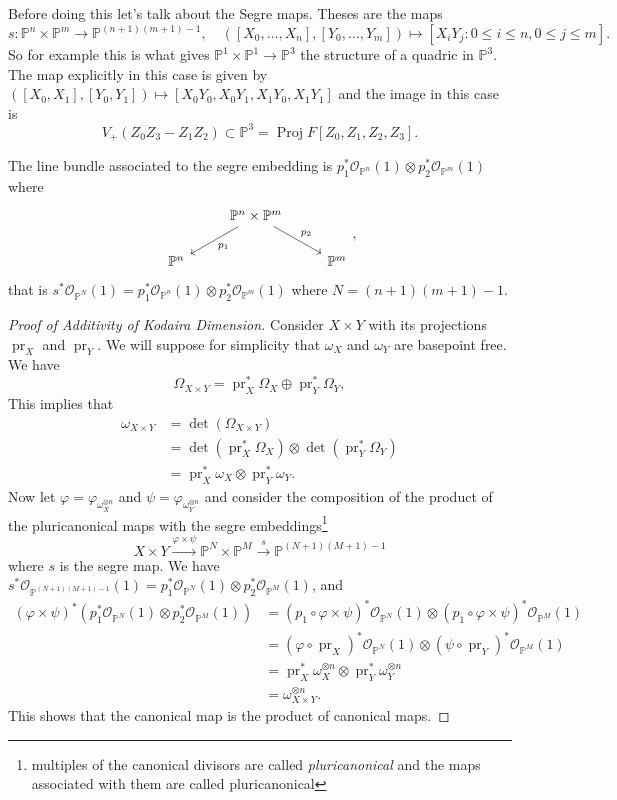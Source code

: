 \documentclass[12pt]{article}
\numberwithin{equation}{section}
\theoremstyle{definition}
\theoremstyle{remark}
\newcommand{\Ocal}{\mathcal{O}}
\newcommand{\PP}{\mathbb{P}}
\newcommand{\Proj}{\operatorname{Proj}}
\newcommand{\pr}{\operatorname{pr}}
\begin{document}
Before doing this let's talk about the Segre maps. 
Theses are the maps 
 $$s:\PP^n\times \PP^m \to \PP^{(n+1)(m+1)-1}, \quad ([X_0,\ldots,X_n],[Y_0,\ldots,Y_m]) \mapsto [X_iY_j \colon 0\leq i \leq n, 0 \leq j \leq m ].$$
So for example this is what gives $\PP^1\times \PP^1 \to \PP^3$ the structure of a quadric in $\PP^3$. The map explicitly in this case is given by $([X_0,X_1],[Y_0,Y_1]) \mapsto [X_0Y_0,X_0Y_1,X_1Y_0,X_1Y_1]$ and the image in this case is 
$$V_+(Z_0Z_3-Z_1Z_2) \subset \PP^3 = \Proj F[Z_0,Z_1,Z_2,Z_3].$$

The line bundle associated to the segre embedding is $p_1^* \Ocal_{\PP^n}(1) \otimes p_2^*\Ocal_{\PP^m}(1)$ where 
$$\begin{tikzcd}
&\PP^n\times \PP^m \ar[dr,"p_2"]\ar[dl,"p_1"]& \\
\PP^n & & \PP^m
\end{tikzcd},$$
that is $s^*\Ocal_{\PP^N}(1) = p_1^* \Ocal_{\PP^n}(1) \otimes p_2^*\Ocal_{\PP^m}(1)$ where $N=(n+1)(m+1)-1$.

\begin{proof}[Proof of Additivity of Kodaira Dimension]
Consider $X\times Y$ with its projections $\pr_X$ and $\pr_Y$. 
We will suppose for simplicity that $\omega_X$ and $\omega_Y$ are basepoint free. 
We have 
 $$ \Omega_{X\times Y} = \pr_X^*\Omega_X\oplus \pr_Y^*\Omega_Y, $$
This implies that 
\begin{align*}
\omega_{X\times Y} &= \det(\Omega_{X\times Y}) \\
&= \det(\pr_X^*\Omega_X) \otimes \det(\pr_Y^*\Omega_Y) \\
&=\pr_X^*\omega_X \otimes \pr_Y^*\omega_Y.
\end{align*}
Now let $\varphi = \varphi_{\omega_X^{\otimes n}}$ and $\psi = \varphi_{\omega_Y^{\otimes n}}$ and consider the composition of the product of the pluricanonical maps with the segre embeddings\footnote{multiples of the canonical divisors are called \emph{pluricanonical} and the maps associated with them are called pluricanonical}
 $$ X\times Y \xrightarrow{\varphi \times \psi } \PP^N\times\PP^M \xrightarrow{s}\PP^{(N+1)(M+1)-1}$$
where $s$ is the segre map.
We have $s^*\Ocal_{\PP^{(N+1)(M+1)-1}}(1)  = p_1^*\Ocal_{\PP^N}(1)\otimes p_2^*\Ocal_{\PP^M}(1)$,
and 
\begin{align*}
 (\varphi\times\psi)^*(p_1^*\Ocal_{\PP^N}(1)\otimes p_2^*\Ocal_{\PP^M}(1))
 &= (p_1\circ \varphi\times \psi)^*\Ocal_{\PP^N}(1) \otimes (p_1\circ \varphi\times \psi)^*\Ocal_{\PP^M}(1) \\
 &=(\varphi \circ \pr_X)^*\Ocal_{\PP^N}(1) \otimes (\psi\circ \pr_Y)^*\Ocal_{\PP^M}(1) \\
 &= \pr_X^*\omega_X^{\otimes n} \otimes \pr_Y^*\omega_Y^{\otimes n} \\
 &= \omega_{X\times Y}^{\otimes n}.
\end{align*}
This shows that the canonical map is the product of canonical maps. 
\end{proof}
\end{document}
